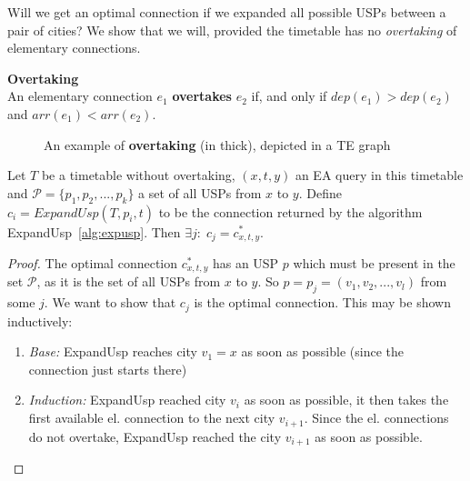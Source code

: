 	\noindent Will we get an optimal connection if we expanded all possible USPs between a pair of cities? We show that we will, provided the timetable has no \textit{overtaking} of elementary connections.
	
	\begin{definition}
        \textbf{Overtaking} \\
		An elementary connection $e_{1}$ \textbf{overtakes} $e_{2}$ if, and only if $dep(e_{1}) > dep(e_{2})$ and $arr(e_{1}) < arr(e_{2})$. 
    \end{definition}
    
    \begin{figure}[h!]
		\begin{center}
		\end{center}
		\caption{\label{fig:overtake} An example of \textcolor{green!80!black}{\textbf{overtaking}} (in thick), depicted in a TE graph}
	\end{figure}
    
    \begin{lemma}
    	Let $T$ be a timetable without overtaking, $(x, t, y)$ an EA query in this timetable and $\mathcal{P} = \{p_{1}, p_{2}, ..., p_{k}\}$ a set of all USPs from $x$ to $y$. Define $c_{i} = ExpandUsp(T, p_{i}, t)$ to be the connection returned by the algorithm ExpandUsp~\ref{alg:expusp}. Then $\exists j:\; c_{j} = c_{x, t, y}^{*}$.
    \end{lemma}
    \begin{proof}
    	The optimal connection $c_{x, t, y}^{*}$ has an USP $p$ which must be present in the set $\mathcal{P}$, as it is the set of all USPs from $x$ to $y$. So $p = p_{j} = (v_{1}, v_{2},..., v_{l})$ from some $j$. We want to show that $c_{j}$ is the optimal connection. This may be shown inductively:
    	\begin{enumerate}
    		\item \textit{Base:} ExpandUsp reaches city $v_{1} = x$ as soon as possible (since the connection just starts there)
    		\item \textit{Induction:} ExpandUsp reached city $v_{i}$ as soon as possible, it then takes the first available el. connection to the next city $v_{i + 1}$. Since the el. connections do not overtake, ExpandUsp reached the city $v_{i + 1}$ as soon as possible.
    	\end{enumerate}
    \end{proof}
	
